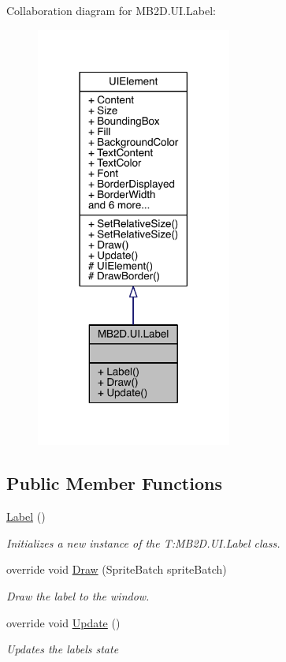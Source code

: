 Collaboration diagram for M\+B2\+D.\+U\+I.\+Label\+:\nopagebreak
\begin{figure}[H]
\begin{center}
\leavevmode
\includegraphics[width=182pt]{class_m_b2_d_1_1_u_i_1_1_label__coll__graph}
\end{center}
\end{figure}
\subsection*{Public Member Functions}
\begin{DoxyCompactItemize}
\item 
\hyperlink{class_m_b2_d_1_1_u_i_1_1_label_af2e14465a2e06ca65487481d543de78c}{Label} ()
\begin{DoxyCompactList}\small\item\em Initializes a new instance of the T\+:\+M\+B2\+D.\+U\+I.\+Label class. \end{DoxyCompactList}\item 
override void \hyperlink{class_m_b2_d_1_1_u_i_1_1_label_a976ec212cedf0710fb35cd578e1e51b1}{Draw} (Sprite\+Batch sprite\+Batch)
\begin{DoxyCompactList}\small\item\em Draw the label to the window. \end{DoxyCompactList}\item 
override void \hyperlink{class_m_b2_d_1_1_u_i_1_1_label_ae4cc8f88f75b0d16d983bb754d214ef4}{Update} ()
\begin{DoxyCompactList}\small\item\em Updates the labels state \end{DoxyCompactList}\end{DoxyCompactItemize}
